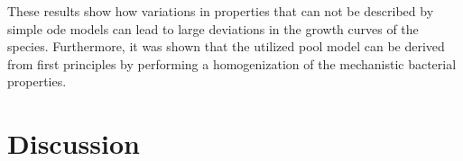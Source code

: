 \documentclass[10pt,twocolumn,5p]{elsarticle}
\numberwithin{equation}{section}
\begin{document}
These results show how variations in properties that can not be described by simple \ac{ode} models can lead to large deviations in the growth curves of the species.
Furthermore, it was shown that the utilized pool model can be derived from first principles by performing a homogenization of the mechanistic bacterial properties.
%
%
\section{Discussion}

%
%
%
\end{document}
